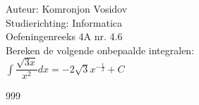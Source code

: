 \documentclass[a4paper]{article}
\newcommand{\dint}{\displaystyle\int}
\begin{document}
	
	\noindent \large Auteur: Komronjon Vosidov \\
	\noindent \large Studierichting: Informatica\\
	\noindent \large Oefeningenreeks 4A nr. 4.6\\
	
	
	\medskip
	\normalsize
	Bereken de volgende onbepaalde integralen:\\
	
$ \dint \dfrac{\sqrt{3x}}{x^2} dx = -2 \sqrt{3}  x^{-\tfrac{1}{2}} + C $
	
	
	
	
	
	
	
	\begin{thebibliography}{999}
	\end{thebibliography}		
\end{document}
